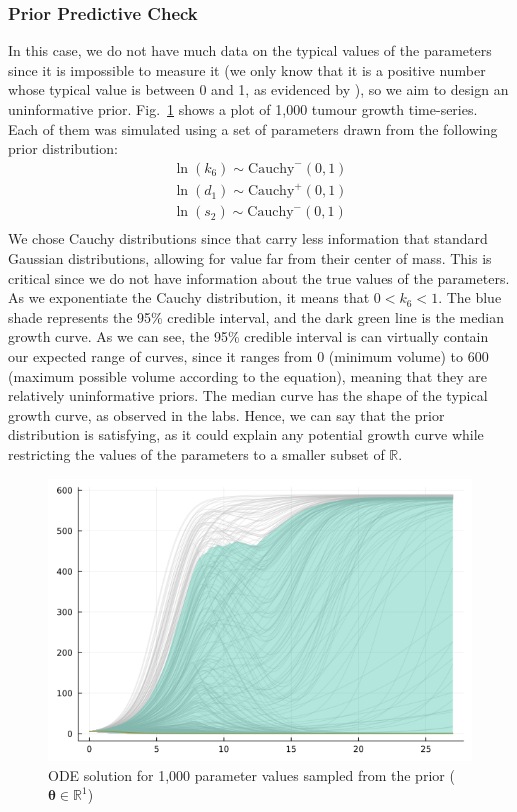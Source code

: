 \documentclass[11pt]{article}
\begin{document}
\subsubsection{Prior Predictive Check}
In this case, we do not have much data on the typical values of the parameters since it is impossible to measure it (we only know that it is a positive number whose typical value is between 0 and 1, as evidenced by \cite{christian1}), so we aim to design an uninformative prior. Fig.~\ref{fig:ppc_1} shows a plot of 1,000 tumour growth time-series. Each of them was simulated using a set of parameters drawn from the following prior distribution:
\begin{align*}
    \ln(k_6) \sim \text{Cauchy}^-(0, 1) \\ 
    \ln(d_1) \sim \text{Cauchy}^+(0, 1) \\ 
    \ln(s_2) \sim \text{Cauchy}^-(0, 1) \\ 
\end{align*} 
We chose Cauchy distributions since that carry less information that standard Gaussian distributions, allowing for value far from their center of mass. This is critical since we do not have information about the true values of the parameters. As we exponentiate the Cauchy distribution, it means that $0 < k_6 < 1$. The blue shade represents the 95\% credible interval, and the dark green line is the median growth curve. As we can see, the 95\% credible interval is can virtually contain our expected range of curves, since it ranges from 0 (minimum volume) to 600 (maximum possible volume according to the equation), meaning that they are relatively uninformative priors. The median curve has the shape of the typical growth curve, as observed in the labs. Hence, we can say that the prior distribution is satisfying, as it could explain any potential growth curve while restricting the values of the parameters to a smaller subset of $\mathbb{R}$.
    \begin{figure}[!ht]
        \centering\includegraphics[scale=0.4]{model_validation/prout1.png}
        \caption{ODE solution for 1,000 parameter values sampled from the prior ($\boldsymbol{\theta} \in \mathbb{R}^1$)}
        \label{fig:ppc_1}
    \end{figure}
\end{document}

